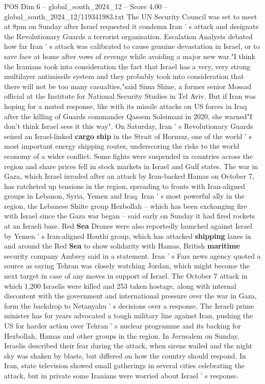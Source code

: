 \begin{textsample}{POS Dim 6 – global\_south\_2024\_12 – Score 4.00 – global\_south\_2024\_12/119341983.txt}
The UN Security Council was set to meet at 8pm on Sunday after Israel requested it condemn Iran ' s attack and designate the Revolutionary Guards a terrorist organisation.
Escalation Analysts debated how far Iran ' s attack was calibrated to cause genuine devastation in Israel, or to save face at home after vows of revenge while avoiding a major new war."I think the Iranians took into consideration the fact that Israel has a very, very strong multilayer antimissile system and they probably took into consideration that there will not be too many casualties,"said Sima Shine, a former senior Mossad official at the Institute for National Security Studies in Tel Aviv.
But if Iran was hoping for a muted response, like with its missile attacks on US forces in Iraq after the killing of Guards commander Qassem Soleimani in 2020, she warned"I don't think Israel sees it this way".
On Saturday, Iran ' s Revolutionary Guards seized an Israel-linked \textbf{cargo} \textbf{ship} in the Strait of Hormuz, one of the world ' s most important energy shipping routes, underscoring the risks to the world economy of a wider conflict.
Some fights were suspended in countries across the region and share prices fell in stock markets in Israel and Gulf states.
The war in Gaza, which Israel invaded after an attack by Iran-backed Hamas on October 7, has ratcheted up tensions in the region, spreading to fronts with Iran-aligned groups in Lebanon, Syria, Yemen and Iraq.
Iran ' s most powerful ally in the region, the Lebanese Shiite group Hezbollah -- which has been exchanging fire with Israel since the Gaza war began -- said early on Sunday it had fired rockets at an Israeli base.
Red \textbf{Sea} Drones were also reportedly launched against Israel by Yemen ' s Iran-aligned Houthi group, which has attacked \textbf{shipping} lanes in and around the Red \textbf{Sea} to show solidarity with Hamas, British \textbf{maritime} security company Ambrey said in a statement.
Iran ' s Fars news agency quoted a source as saying Tehran was closely watching Jordan, which might become the next target in case of any moves in support of Israel.
The October 7 attack in which 1,200 Israelis were killed and 253 taken hostage, along with internal discontent with the government and international pressure over the war in Gaza, form the backdrop to Netanyahu ' s decisions over a response.
The Israeli prime minister has for years advocated a tough military line against Iran, pushing the US for harder action over Tehran ' s nuclear programme and its backing for Hezbollah, Hamas and other groups in the region.
In Jerusalem on Sunday, Israelis described their fear during the attack, when sirens wailed and the night sky was shaken by blasts, but differed on how the country should respond.
In Iran, state television showed small gatherings in several cities celebrating the attack, but in private some Iranians were worried about Israel ' s response.

\end{textsample}
